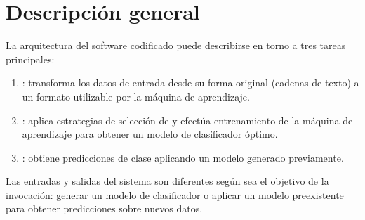 %
%
%
\section{Descripción general}
%
La arquitectura del software codificado puede describirse en torno a
tres tareas principales:
%
\begin{enumerate}
\item
  :
  transforma los datos de entrada desde su forma original (cadenas de
  texto) a un formato utilizable por la máquina de aprendizaje.
\item
  :
  aplica estrategias de selección de  y efectúa
  entrenamiento de la máquina de aprendizaje para obtener un modelo
  de clasificador óptimo.
\item
  :
  obtiene predicciones de clase aplicando un modelo generado
  previamente.
\end{enumerate}
%
Las entradas y salidas del sistema son diferentes según sea el
objetivo de la invocación: generar un modelo de clasificador o aplicar
un modelo preexistente para obtener predicciones sobre nuevos datos.

